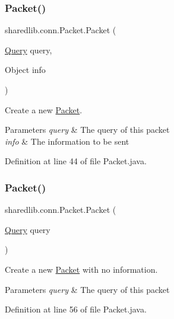\subsubsection{\texorpdfstring{Packet()}{Packet()}\hspace{0.1cm}{\footnotesize\ttfamily [1/3]}}
{\footnotesize\ttfamily sharedlib.\+conn.\+Packet.\+Packet (\begin{DoxyParamCaption}\item[{\hyperlink{enumsharedlib_1_1conn_1_1_query}{Query}}]{query,  }\item[{Object}]{info }\end{DoxyParamCaption})}

Create a new \hyperlink{classsharedlib_1_1conn_1_1_packet}{Packet}.


\begin{DoxyParams}{Parameters}
{\em query} & The query of this packet \\
\hline
{\em info} & The information to be sent \\
\hline
\end{DoxyParams}


Definition at line 44 of file Packet.\+java.

\hypertarget{classsharedlib_1_1conn_1_1_packet_a0d370b10ed28aad9468e986cc673c48b}{}\label{classsharedlib_1_1conn_1_1_packet_a0d370b10ed28aad9468e986cc673c48b} 
\subsubsection{\texorpdfstring{Packet()}{Packet()}\hspace{0.1cm}{\footnotesize\ttfamily [2/3]}}
{\footnotesize\ttfamily sharedlib.\+conn.\+Packet.\+Packet (\begin{DoxyParamCaption}\item[{\hyperlink{enumsharedlib_1_1conn_1_1_query}{Query}}]{query }\end{DoxyParamCaption})}

Create a new \hyperlink{classsharedlib_1_1conn_1_1_packet}{Packet} with no information.


\begin{DoxyParams}{Parameters}
{\em query} & The query of this packet \\
\hline
\end{DoxyParams}


Definition at line 56 of file Packet.\+java.

